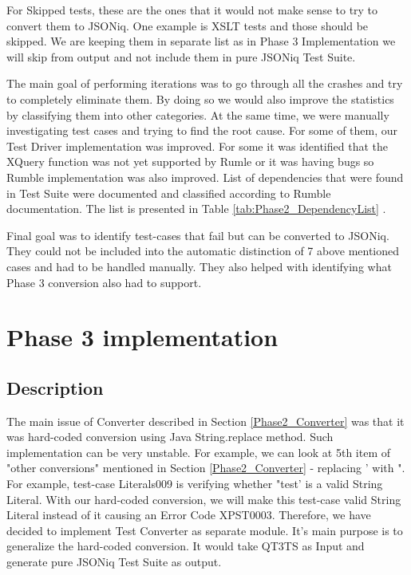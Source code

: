 For Skipped tests, these are the ones that it would not make sense to try to convert them to JSONiq. One example is XSLT tests and those should be skipped. We are keeping them in separate list as in Phase 3 Implementation we will skip from output and not include them in pure JSONiq Test Suite.

The main goal of performing iterations was to go through all the crashes and try to completely eliminate them. By doing so we would also improve the statistics by classifying them into other categories. At the same time, we were manually investigating test cases and trying to find the root cause. For some of them, our Test Driver implementation was improved. For some it was identified that the XQuery function was not yet supported by Rumle or it was having bugs so Rumble implementation was also improved. List of dependencies that were found in Test Suite were documented and classified according to Rumble documentation. The list is presented in Table \ref{tab:Phase2_DependencyList} . 

Final goal was to identify test-cases that fail but can be converted to JSONiq. They could not be included into the automatic distinction of 7 above mentioned cases and had to be handled manually. They also helped with identifying what Phase 3 conversion also had to support.

\section{Phase 3 implementation}
\subsection{Description}
\label{Phase3_Description}
The main issue of Converter described in Section \ref{Phase2_Converter} was that it was hard-coded conversion using Java String.replace method. Such implementation can be very unstable. For example, we can look at 5th item of "other conversions" mentioned in Section \ref{Phase2_Converter} - replacing ' with ". For example, test-case Literals009 is verifying whether "test' is a valid String Literal. With our hard-coded conversion, we will make this test-case valid String Literal instead of it causing an Error Code XPST0003. Therefore, we have decided to implement Test Converter as separate module. It's main purpose is to generalize the hard-coded conversion. It would take QT3TS as Input and generate pure JSONiq Test Suite as output.

